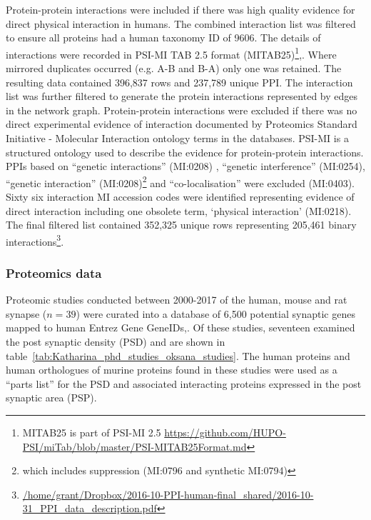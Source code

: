Protein-protein interactions were included if there was high quality evidence for direct physical interaction in humans. The combined interaction list was filtered to ensure all proteins had a human taxonomy ID of 9606. The details of interactions were recorded in PSI-MI TAB 2.5 format (MITAB25)\footnote{MITAB25 is part of  PSI-MI 2.5 \url{https://github.com/HUPO-PSI/miTab/blob/master/PSI-MITAB25Format.md}}\cite{isserlin2011biomolecular},\cite{heil2018systems}. Where mirrored duplicates occurred (e.g. A-B and B-A) only one was retained. The  resulting data contained 396,837 rows and 237,789 unique PPI.  The interaction list was further filtered to generate the protein interactions represented by edges in the network graph. Protein-protein interactions were excluded if there was no direct experimental evidence of interaction documented by Proteomics Standard Initiative - Molecular Interaction ontology terms in the databases. PSI-MI is a structured ontology used to describe the evidence for protein-protein interactions.\cite{isserlin2011biomolecular} PPIs based on ``genetic interactions'' (MI:0208) , ``genetic interference'' (MI:0254), ``genetic interaction'' (MI:0208)\footnote{which includes suppression (MI:0796 and synthetic MI:0794)} and ``co-localisation'' were excluded (MI:0403). Sixty six interaction MI accession codes were identified representing evidence of direct interaction including one obsolete term, `physical interaction' (MI:0218). The final filtered list contained 352,325 unique rows representing 205,461 binary interactions\footnote{\url{/home/grant/Dropbox/2016-10-PPI-human-final_shared/2016-10-31_PPI_data_description.pdf}}.




\subsubsection{Proteomics data}
\label{sec:proteomics data}
Proteomic studies conducted between 2000-2017 of the human, mouse and rat synapse ($n=39$) were curated into a database of 6,500 potential synaptic genes  mapped to human Entrez Gene GeneIDs\cite{heil2018systems},\cite{maglott2005entrez}.  Of these studies, seventeen examined the post synaptic density (PSD) and are shown in table~\ref{tab:Katharina_phd_studies_oksana_studies}.
The human proteins and human orthologues of murine proteins found in these studies were used as a ``parts list'' for the PSD and associated interacting proteins expressed in the post synaptic area (PSP). 

